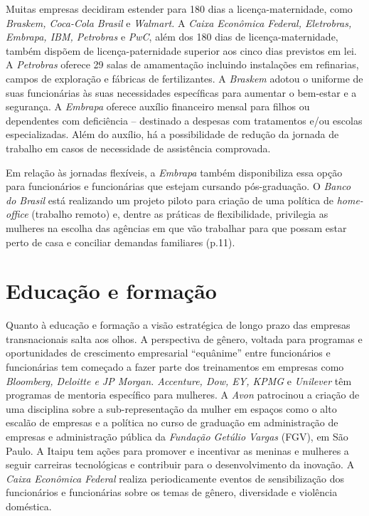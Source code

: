 Muitas empresas decidiram estender para 180 dias a licença-maternidade,
como \emph{Braskem, Coca-Cola Brasil} e \emph{Walmart.} A \emph{Caixa
Econômica Federal, Eletrobras, Embrapa, IBM, Petrobras} e \emph{PwC},
além dos 180 dias de licença-maternidade, também dispõem de
licença-paternidade superior aos cinco dias previstos em lei. A
\emph{Petrobras} oferece 29 salas de amamentação incluindo instalações
em refinarias, campos de exploração e fábricas de fertilizantes. A
\emph{Braskem} adotou o uniforme de suas funcionárias às suas
necessidades específicas para aumentar o bem-estar e a segurança. A
\emph{Embrapa} oferece auxílio financeiro mensal para filhos ou
dependentes com deficiência -- destinado a despesas com tratamentos e/ou
escolas especializadas. Além do auxílio, há a possibilidade de redução
da jornada de trabalho em casos de necessidade de assistência
comprovada.

Em relação às jornadas flexíveis, a \emph{Embrapa} também disponibiliza
essa opção para funcionários e funcionárias que estejam cursando
pós-graduação. O \emph{Banco do Brasil} está realizando um projeto
piloto para criação de uma política de \emph{home-office} (trabalho
remoto) e, dentre as práticas de flexibilidade, privilegia as mulheres
na escolha das agências em que vão trabalhar para que possam estar perto
de casa e conciliar demandas familiares (p.11).

\section{Educação e formação}

Quanto à educação e formação a visão estratégica de longo prazo das
empresas transnacionais salta aos olhos. A perspectiva de gênero,
voltada para programas e oportunidades de crescimento empresarial
``equânime'' entre funcionários e funcionárias tem começado a fazer
parte dos treinamentos em empresas como \emph{Bloomberg, Deloitte e JP
Morgan. Accenture, Dow, EY, KPMG} e \emph{Unilever} têm programas de
mentoria específico para mulheres. A \emph{Avon} patrocinou a criação de
uma disciplina sobre a sub-representação da mulher em espaços como o
alto escalão de empresas e a política no curso de graduação em
administração de empresas e administração pública da \emph{Fundação
Getúlio Vargas} (FGV), em São Paulo. A Itaipu tem ações para promover e
incentivar as meninas e mulheres a seguir carreiras tecnológicas e
contribuir para o desenvolvimento da inovação. A \emph{Caixa Econômica
Federal} realiza periodicamente eventos de sensibilização dos
funcionários e funcionárias sobre os temas de gênero, diversidade e
violência doméstica.

